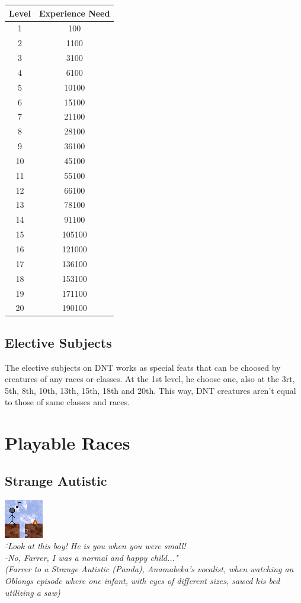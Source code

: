 \documentclass[ letterpaper,12pt]{article}
\begin{document}
\begin{center}
\begin{tabular}{|c||c|}
\hline
Level & Experience Need\\
\hline
1 & 100\\
\hline
2 & 1100\\
\hline
3 & 3100\\
\hline
4 & 6100\\
\hline
5 & 10100\\
\hline
6 & 15100\\
\hline
7 & 21100\\
\hline
8 & 28100\\
\hline
9 & 36100\\
\hline
10 & 45100\\
\hline
11 & 55100\\
\hline
12 & 66100\\
\hline
13 & 78100\\
\hline
14 & 91100\\
\hline
15 & 105100\\
\hline
16 & 121000\\
\hline
17 & 136100\\
\hline
18 & 153100\\
\hline
19 & 171100\\
\hline
20 & 190100\\
\hline
\end{tabular}
\end{center}

\subsection{Elective Subjects}

The elective subjects on DNT works as special feats that can be choosed by
creatures  of any races or classes. At the 1st level, he choose one, also at
the 3rt, 5th, 8th, 10th, 13th, 15th, 18th and 20th. This way, DNT creatures
aren't equal to those of same classes and races.

\section{Playable Races}

\subsection{Strange Autistic}
\includegraphics{../data/races/Img/autista.png}\\
{\it \" -Look at this boy! He is you when you were small!\\
 -No, Farrer, I was a normal and happy child..."\\
(Farrer to a Strange Autistic (Panda), Anamabeka's vocalist, when watching an Oblongs episode where one infant, with eyes of different sizes, sawed his bed utilizing a saw)\\}
\end{document}
